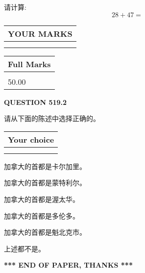 \documentclass{ctexart}
\begin{document}
  
 
请计算:
\begin{equation}
28 +  %
47 = \nonumber
\end{equation}
 

 

 
  
\vspace{0.2in}
  
\noindent\begin{tabular}{|l|}
\hline
 YOUR MARKS  \\
\hline
 \\ 
 \\ 
\hline
\end{tabular}
\hspace{0.05in} \begin{tabular}{|l|}
\hline
 Full Marks  \\
\hline
 \\ 
50.00 \\
\hline
\end{tabular}
{\textbf{\Large{QUESTION
519.2 
}}}
  
  
请从下面的陈述中选择正确的。
  
  
\noindent\hspace{3.0in} \begin{tabular}{|l|}
\hline
Your choice \\
\hline
 \\ 
 \\ 
\hline
\end{tabular}
  
  
 
 
加拿大的首都是卡尔加里。
 
 
加拿大的首都是蒙特利尔。
 
 
加拿大的首都是渥太华。
 
 
加拿大的首都是多伦多。
 
 
加拿大的首都是魁北克市。
 
 
 上述都不是。
 
 
   
   
 \vspace{0.2in}
 
   
   
   
   
\vspace{1.0in} 
{\textbf{\large{ *** END OF PAPER, THANKS *** }}} 
   
\end{document}
